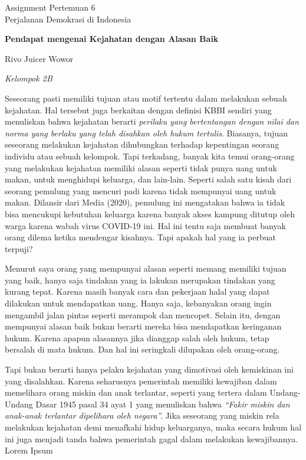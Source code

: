 \documentclass[
  12pt  
]{article}
\newcommand{\mytitle}{Pendapat mengenai Kejahatan dengan Alasan Baik}
\newcommand{\theauthor}{Rivo Juicer Wowor}
\newcommand{\affiliation}{Kelompok 2B}
\begin{document}
\begin{titlepage}
  \vspace*{\fill}
  \centering
  Assignment Pertemuan 6 \\
  Perjalanan Demokrasi di Indonesia \par
  \vspace{0.5cm}
  \LARGE{\textbf{\mytitle}} \par
  \vspace{0.5cm}
  \large{\theauthor} \par
  \small{\emph{\affiliation}} \par
  \vfill
\end{titlepage}
Seseorang pasti memiliki tujuan atau motif tertentu dalam melakukan
sebuah kejahatan. Hal tersebut juga berkaitan dengan definisi KBBI
sendiri yang menuliskan bahwa kejahatan berarti \emph{perilaku yang
bertentangan dengan nilai dan norma yang berlaku yang telah disahkan
oleh hukum tertulis}. Biasanya, tujuan seseorang melakukan kejahatan
dihubungkan terhadap kepentingan seorang individu atau sebuah kelompok.
Tapi terkadang, banyak kita temui orang-orang yang melakukan kejahatan
memiliki alasan seperti tidak punya uang untuk makan, untuk menghidupi
keluarga, dan lain-lain. Seperti salah satu kisah dari seorang pemulung
yang mencuri padi karena tidak mempunyai uang untuk makan. Dilansir dari
Media (2020), pemulung ini mengatakan bahwa ia tidak bisa mencukupi
kebutuhan keluarga karena banyak akses kampung ditutup oleh warga karena
wabah virus COVID-19 ini. Hal ini tentu saja membuat banyak orang dilema
ketika mendengar kisahnya. Tapi apakah hal yang ia perbuat terpuji?

Menurut saya orang yang mempunyai alasan seperti memang memiliki tujuan
yang baik, hanya saja tindakan yang ia lakukan merupakan tindakan yang
kurang tepat. Karena masih banyak cara dan pekerjaan halal yang dapat
dilakukan untuk mendapatkan uang. Hanya saja, kebanyakan orang ingin
mengambil jalan pintas seperti merampok dan mencopet. Selain itu, dengan
mempunyai alasan baik bukan berarti mereka bisa mendapatkan keringanan
hukum. Karena apapun alasannya jika dianggap salah oleh hukum, tetap
bersalah di mata hukum. Dan hal ini seringkali dilupakan oleh
orang-orang.

Tapi bukan berarti hanya pelaku kejahatan yang dimotivasi oleh
kemiskinan ini yang disalahkan. Karena seharusnya pemerintah memiliki
kewajiban dalam memelihara orang miskin dan anak terlantar, seperti yang
tertera dalam Undang-Undang Dasar 1945 pasal 34 ayat 1 yang menuliskan
bahwa \emph{``Fakir miskin dan anak-anak terlantar dipelihara oleh
negara''.} Jika seseorang yang miskin rela melakukan kejahatan demi
menafkahi hidup keluarganya, maka secara hukum hal ini juga menjadi
tanda bahwa pemerintah gagal dalam melakukan kewajibannya. Lorem Ipsum
\end{document}
